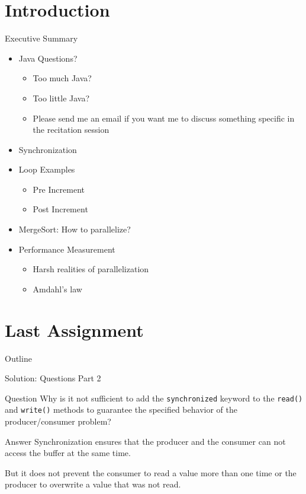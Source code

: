 \section*{Introduction}

\begin{frame}{Executive Summary}
  \begin{itemize}
  \item Java Questions?
    \begin{itemize}
    \item Too much Java?
    \item Too little Java?
    \item Please send me an email if you want me to discuss something
      specific in the recitation session
    \end{itemize}
  \item Synchronization
  \item Loop Examples
    \begin{itemize}
    \item Pre Increment
    \item Post Increment
    \end{itemize}
  \item MergeSort: How to parallelize?
  \item Performance Measurement
    \begin{itemize}
    \item Harsh realities of parallelization
    \item Amdahl's law
    \end{itemize}
  \end{itemize}
\end{frame}


\section{Last Assignment}

\begin{frame}{Outline}
  \tableofcontents[current]
\end{frame}

\begin{frame}{Solution: Questions Part 2}
  \begin{block}{Question}
    Why is it not sufficient to add the \lstinline!synchronized!
    keyword to the \lstinline!read()! and \lstinline!write()! methods
    to guarantee the specified behavior of the producer/consumer
    problem?
  \end{block}


  \pause

  \begin{exampleblock}{Answer}
    Synchronization ensures that the producer and the consumer can not
    access the buffer at the same time.

    But it does not prevent the consumer to read a value more than one
    time or the producer to overwrite a value that was not read.
  \end{exampleblock}
\end{frame}

